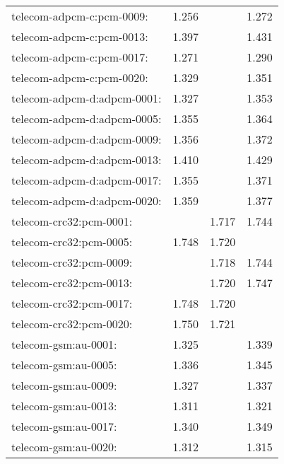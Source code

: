 \begin{longtable}{lrrr}
telecom-adpcm-c:pcm-0009: & 1.256 & \color{Green}{1.291} & 1.272 \\
telecom-adpcm-c:pcm-0013: & 1.397 & \color{Green}{1.443} & 1.431 \\
telecom-adpcm-c:pcm-0017: & 1.271 & \color{Green}{1.308} & 1.290 \\
telecom-adpcm-c:pcm-0020: & 1.329 & \color{Green}{1.356} & 1.351 \\
telecom-adpcm-d:adpcm-0001: & 1.327 & \color{Green}{1.363} & 1.353 \\
telecom-adpcm-d:adpcm-0005: & 1.355 & \color{Green}{1.373} & 1.364 \\
telecom-adpcm-d:adpcm-0009: & 1.356 & \color{Green}{1.376} & 1.372 \\
telecom-adpcm-d:adpcm-0013: & 1.410 & \color{Green}{1.441} & 1.429 \\
telecom-adpcm-d:adpcm-0017: & 1.355 & \color{Green}{1.375} & 1.371 \\
telecom-adpcm-d:adpcm-0020: & 1.359 & \color{Green}{1.382} & 1.377 \\
telecom-crc32:pcm-0001: & \color{Green}{1.750} & 1.717 & 1.744 \\
telecom-crc32:pcm-0005: & 1.748 & 1.720 & \color{Green}{1.749} \\
telecom-crc32:pcm-0009: & \color{Green}{1.751} & 1.718 & 1.744 \\
telecom-crc32:pcm-0013: & \color{Green}{1.749} & 1.720 & 1.747 \\
telecom-crc32:pcm-0017: & 1.748 & 1.720 & \color{Green}{1.754} \\
telecom-crc32:pcm-0020: & 1.750 & 1.721 & \color{Green}{1.752} \\
telecom-gsm:au-0001: & 1.325 & \color{Green}{1.341} & 1.339 \\
telecom-gsm:au-0005: & 1.336 & \color{Green}{1.350} & 1.345 \\
telecom-gsm:au-0009: & 1.327 & \color{Green}{1.344} & 1.337 \\
telecom-gsm:au-0013: & 1.311 & \color{Green}{1.325} & 1.321 \\
telecom-gsm:au-0017: & 1.340 & \color{Green}{1.353} & 1.349 \\
telecom-gsm:au-0020: & 1.312 & \color{Green}{1.331} & 1.315 \\
\end{longtable}
